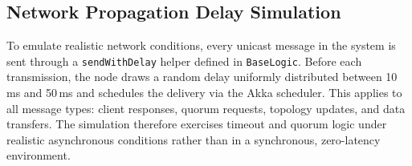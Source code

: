 \subsection{Network Propagation Delay Simulation}
To emulate realistic network conditions, every unicast message in the system is
sent through a \texttt{sendWithDelay} helper defined in \texttt{BaseLogic}.
Before each transmission, the node draws a random delay uniformly distributed
between 10\,ms and 50\,ms and schedules the delivery via the Akka scheduler.
This applies to all message types: client responses, quorum requests,
topology updates, and data transfers. The simulation therefore exercises
timeout and quorum logic under realistic asynchronous conditions rather than
in a synchronous, zero-latency environment.
